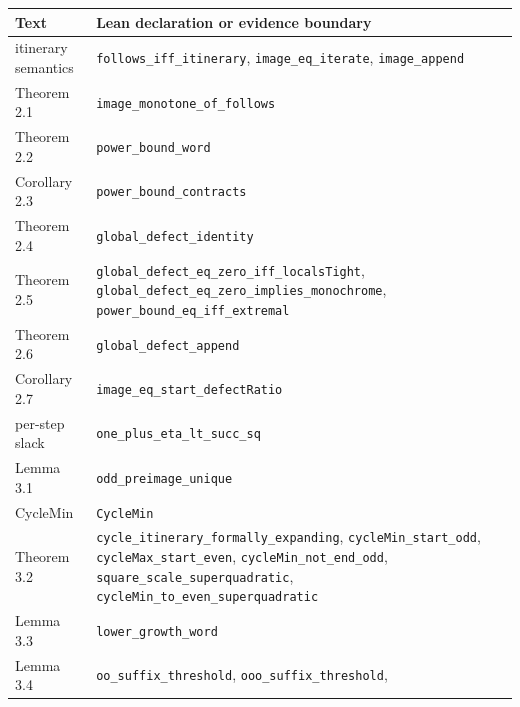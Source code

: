 \documentclass[12pt]{article}
\begin{document}
\begingroup\small

\begin{longtable}[]{@{}
  >{\raggedright\arraybackslash}p{}
  >{\raggedright\arraybackslash}p{}@{}}
\toprule\noalign{}
\begin{minipage}[b]{\linewidth}\raggedright
Text
\end{minipage} & \begin{minipage}[b]{\linewidth}\raggedright
Lean declaration or evidence boundary
\end{minipage} \\
\midrule\noalign{}
\endhead
\bottomrule\noalign{}
\endfoot
\bottomrule\noalign{}
\endlastfoot
itinerary semantics & \texttt{\nolinkurl{follows_iff_itinerary}},
\texttt{\nolinkurl{image_eq_iterate}},
\texttt{\nolinkurl{image_append}} \\
Theorem 2.1 & \texttt{\nolinkurl{image_monotone_of_follows}} \\
Theorem 2.2 & \texttt{\nolinkurl{power_bound_word}} \\
Corollary 2.3 & \texttt{\nolinkurl{power_bound_contracts}} \\
Theorem 2.4 & \texttt{\nolinkurl{global_defect_identity}} \\
Theorem 2.5 &
\texttt{\nolinkurl{global_defect_eq_zero_iff_localsTight}},
\texttt{\nolinkurl{global_defect_eq_zero_implies_monochrome}},
\texttt{\nolinkurl{power_bound_eq_iff_extremal}} \\
Theorem 2.6 & \texttt{\nolinkurl{global_defect_append}} \\
Corollary 2.7 & \texttt{\nolinkurl{image_eq_start_defectRatio}} \\
per-step slack & \texttt{\nolinkurl{one_plus_eta_lt_succ_sq}} \\
Lemma 3.1 & \texttt{\nolinkurl{odd_preimage_unique}} \\
CycleMin & \texttt{\nolinkurl{CycleMin}} \\
Theorem 3.2 & \texttt{\nolinkurl{cycle_itinerary_formally_expanding}},
\texttt{\nolinkurl{cycleMin_start_odd}},
\texttt{\nolinkurl{cycleMax_start_even}},
\texttt{\nolinkurl{cycleMin_not_end_odd}},
\texttt{\nolinkurl{square_scale_superquadratic}},
\texttt{\nolinkurl{cycleMin_to_even_superquadratic}} \\
Lemma 3.3 & \texttt{\nolinkurl{lower_growth_word}} \\
Lemma 3.4 & \texttt{\nolinkurl{oo_suffix_threshold}},
\texttt{\nolinkurl{ooo_suffix_threshold}},

\end{longtable}
\end{document}
